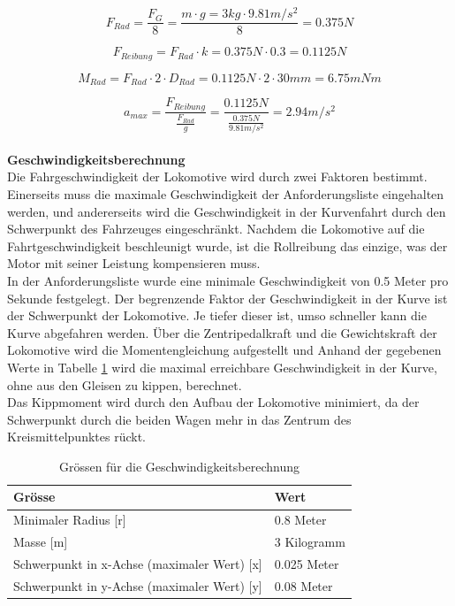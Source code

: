 \documentclass[../../main.tex]{subfiles}
\begin{document}
    $$F_{Rad}=\frac{F_{G}}{8}=\frac{m \cdot g=3kg \cdot 9.81m/s^2}{8}=0.375N$$

    $$F_{Reibung}=F_{Rad} \cdot k=0.375N \cdot 0.3=0.1125N$$

    $$M_{Rad}=F_{Rad} \cdot 2\cdot D_{Rad}= 0.1125N \cdot 2 \cdot 30mm = 6.75mNm$$

    $$a_{max}=\frac{F_{Reibung}}{\frac{F_{Rad}}{g}}=\frac{0.1125N}{\frac{0.375N}{9.81m/s^2}}=2.94m/s^2$$
    \\

    \label{GeschwindigkeitsberechnungFahrwerk}
    \textbf{Geschwindigkeitsberechnung}\\
    Die Fahrgeschwindigkeit der Lokomotive wird durch zwei Faktoren bestimmt. Einerseits muss die maximale Geschwindigkeit der Anforderungsliste eingehalten werden, und andererseits wird die Geschwindigkeit in der Kurvenfahrt durch den Schwerpunkt des Fahrzeuges eingeschränkt. Nachdem die Lokomotive auf die Fahrtgeschwindigkeit beschleunigt wurde, ist die Rollreibung das einzige, was der Motor mit seiner Leistung kompensieren muss.\\

    In der Anforderungsliste wurde eine minimale Geschwindigkeit von 0.5 Meter pro Sekunde festgelegt. Der begrenzende Faktor der Geschwindigkeit in der Kurve ist der Schwerpunkt der Lokomotive. Je tiefer dieser ist, umso schneller kann die Kurve abgefahren werden. Über die Zentripedalkraft und die Gewichtskraft der Lokomotive wird die Momentengleichung aufgestellt und Anhand der gegebenen Werte in Tabelle \ref{tab:geschwindigkeitsberechnung} wird die maximal erreichbare Geschwindigkeit in der Kurve, ohne aus den Gleisen zu kippen, berechnet.\\

    Das Kippmoment wird durch den Aufbau der Lokomotive minimiert, da der Schwerpunkt durch die beiden Wagen mehr in das Zentrum des Kreismittelpunktes rückt.\\

    \begin{table}[H] \centering
        \begin{tabular}{|l|l|}
        \hline
        \textbf{Grösse} & \textbf{Wert}\\
        \hline
        Minimaler Radius  [r]                               & 0.8 Meter\\
         \hline
        Masse [m]                                           & 3 Kilogramm\\
        \hline
        Schwerpunkt in x-Achse (maximaler Wert) [x]         & 0.025 Meter\\
        \hline
        Schwerpunkt in y-Achse (maximaler Wert) [y]         & 0.08 Meter\\
        \hline
        \end{tabular}

        \caption{Grössen für die Geschwindigkeitsberechnung}
        \label{tab:geschwindigkeitsberechnung}
        \end{table}
\end{document}
